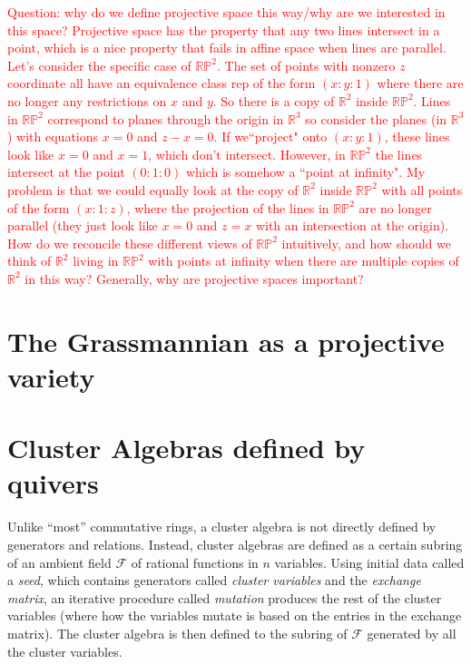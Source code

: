 \documentclass[12pt]{amsart}
\theoremstyle{remark}
\theoremstyle{remark}
\begin{document}
\textcolor{red}{
Question: why do we define projective space this way/why are we interested in this space?
Projective space has the property that any two lines intersect in a point, which is a nice property that fails in affine space when lines are parallel.
Let's consider the specific case of $\mathbb{RP}^2$.
The set of points with nonzero $z$ coordinate all have an equivalence class rep of the form $(x : y : 1)$ where there are no longer any restrictions on $x$ and $y$.
So there is a copy of $\mathbb{R}^2$ inside $\mathbb{RP}^2$.
Lines in $\mathbb{RP}^2$ correspond to planes through the origin in $\mathbb{R}^3$ so consider the planes (in $\mathbb{R}^3$) with equations $x = 0$ and $z - x = 0$. 
If we``project" onto $(x : y : 1)$, these lines look like $x = 0$ and $x = 1$, which don't intersect.
However, in $\mathbb{RP}^2$ the lines intersect at the point $(0 : 1 : 0)$ which is somehow a ``point at infinity". 
My problem is that we could equally look at the copy of $\mathbb{R}^2$ inside $\mathbb{RP}^2$ with all points of the form $(x : 1 : z)$, where the projection of the lines in $\mathbb{RP}^2$ are no longer parallel (they just look like $x = 0$ and $z = x$ with an intersection at the origin). 
How do we reconcile these different views of $\mathbb{RP}^2$ intuitively, and how should we think of $\mathbb{R}^2$ living in $\mathbb{RP}^2$ with points at infinity when there are multiple copies of $\mathbb{R}^2$ in this way?
Generally, why are projective spaces important?
}

\section{The Grassmannian as a projective variety}



\section{Cluster Algebras defined by quivers}
Unlike ``most'' commutative rings, a cluster algebra is not directly defined by generators and relations.
Instead, cluster algebras are defined as a certain subring of an ambient field $\mathcal{F}$ of rational functions in $n$ variables.
Using initial data called a \emph{seed}, which contains generators called \emph{cluster variables} and the \emph{exchange matrix}, an iterative procedure called \emph{mutation} produces the rest of the cluster variables (where how the variables mutate is based on the entries in the exchange matrix).
The cluster algebra is then defined to the subring of $\mathcal{F}$ generated by all the cluster variables.
\end{document}
